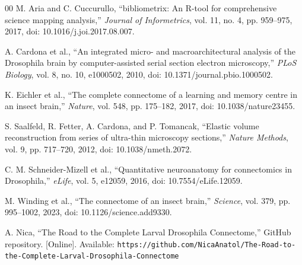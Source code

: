 \documentclass[conference]{IEEEtran}
\begin{document}

\begin{thebibliography}{00}
M. Aria and C. Cuccurullo, ``bibliometrix: An R-tool for comprehensive
science mapping analysis,'' \textit{Journal of Informetrics}, vol. 11,
no. 4, pp. 959--975, 2017, doi: 10.1016/j.joi.2017.08.007.

A. Cardona et al., ``An integrated micro- and macroarchitectural analysis
of the Drosophila brain by computer-assisted serial section electron
microscopy,'' \textit{PLoS Biology}, vol. 8, no. 10, e1000502, 2010,
doi: 10.1371/journal.pbio.1000502.

K. Eichler et al., ``The complete connectome of a learning and memory
centre in an insect brain,'' \textit{Nature}, vol. 548, pp. 175--182,
2017, doi: 10.1038/nature23455.

S. Saalfeld, R. Fetter, A. Cardona, and P. Tomancak, ``Elastic volume
reconstruction from series of ultra-thin microscopy sections,''
\textit{Nature Methods}, vol. 9, pp. 717--720, 2012,
doi: 10.1038/nmeth.2072.

C. M. Schneider-Mizell et al., ``Quantitative neuroanatomy for connectomics
in Drosophila,'' \textit{eLife}, vol. 5, e12059, 2016,
doi: 10.7554/eLife.12059.

M. Winding et al., ``The connectome of an insect brain,''
\textit{Science}, vol. 379, pp. 995--1002, 2023,
doi: 10.1126/science.add9330.

A. Nica, ``The Road to the Complete Larval Drosophila Connectome,''
GitHub repository. [Online]. Available:
\texttt{https://github.com/NicaAnatol/The-Road-to-the-Complete-Larval-Drosophila-Connectome}
\end{thebibliography}
\end{document}
